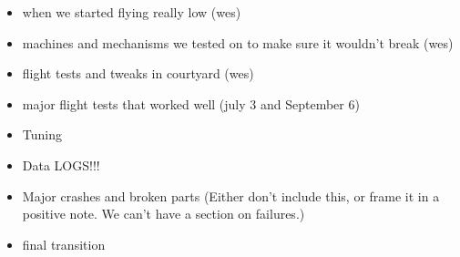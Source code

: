 \color{red}
\begin{itemize}
\item when we started flying really low (wes) 
\item machines and mechanisms we tested on to make sure it wouldn’t break (wes) 
\item flight tests and tweaks in courtyard (wes) 
\item major flight tests that worked well (july 3 and September 6) 
\item Tuning 
\item Data LOGS!!! 
\item Major crashes and broken parts (Either don't include this, or frame it in a positive note. We can't have a section on failures.)
\item final transition
\end{itemize}
\color{black}